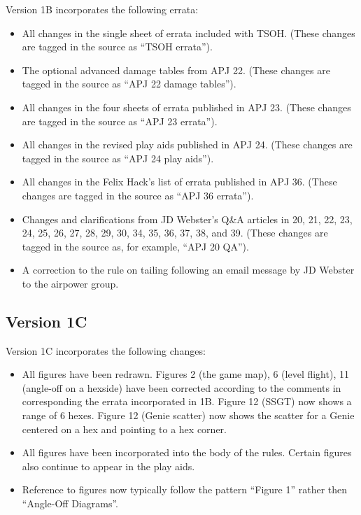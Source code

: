 \documentclass[10pt]{article}
\begin{document}
Version 1B incorporates the following errata:

\begin{itemize}
    \item All changes in the single sheet of errata included with TSOH. (These changes are tagged in the source as “TSOH errata”).
    \item The optional advanced damage tables from APJ 22. (These changes are tagged in the source as “APJ 22 damage tables”).
    \item All changes in the four sheets of errata published in APJ 23. (These changes are tagged in the source as “APJ 23 errata”).
    \item All changes in the revised play aids published in APJ 24. (These changes are tagged in the source as “APJ 24 play aids”).
    \item All changes in the Felix Hack's list of errata published in APJ 36. (These changes are tagged in the source as “APJ 36 errata”).
    \item Changes and clarifications from JD Webster's Q\&A articles in {\APJ} 20, 21, 22, 23, 24, 25, 26, 27, 28, 29, 30, 34, 35, 36, 37, 38, and 39. (These changes are tagged in the source as, for example, “APJ 20 QA”).
    \item A correction to the rule on tailing following an email message by JD Webster to the airpower group.
    
\end{itemize}

\subsection{Version 1C}

Version 1C incorporates the following changes:

\begin{itemize}
    \item All figures have been redrawn. Figures 2 (the game map), 6 (level flight), 11 (angle-off on a hexside) have been corrected according to the comments in corresponding the errata incorporated in 1B. Figure 12 (SSGT) now shows a range of 6 hexes. Figure 12 (Genie scatter) now shows the scatter for a Genie centered on a hex and pointing to a hex corner.
    \item All figures have been incorporated into the body of the rules. Certain figures also continue to appear in the play aids.
    \item Reference to figures now typically follow the pattern “Figure 1” rather then “Angle-Off Diagrams”.
\end{itemize}
\end{document}
